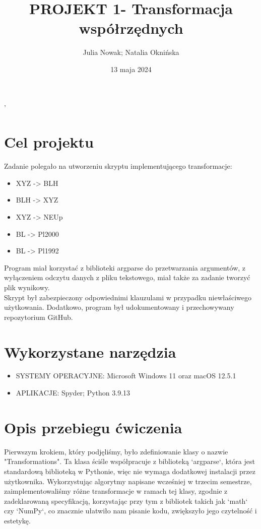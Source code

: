 '\documentclass[a4paper,12pt]{article}
\title{PROJEKT 1- Transformacja współrzędnych}
\author{Julia Nowak; Natalia Oknińska}
\date{13 maja 2024}
\begin{document}
\maketitle

\tableofcontents %

\section{Cel projektu}

Zadanie polegało na utworzeniu skryptu implementującego transformacje:

\begin{itemize}
  \item XYZ -> BLH
  \item BLH -> XYZ
  \item XYZ -> NEUp
  \item BL -> Pl2000
  \item BL -> Pl1992
\end{itemize}

Program miał korzystać z biblioteki argparse do przetwarzania argumentów, z wyłączeniem  odczytu danych z pliku tekstowego, miał także za zadanie tworzyć plik wynikowy.\\ Skrypt był zabezpieczony odpowiednimi klauzulami w przypadku niewłaściwego użytkowania. Dodatkowo, program był udokumentowany i przechowywany repozytorium GitHub.

\section{Wykorzystane narzędzia}

\begin{itemize}
  \item SYSTEMY OPERACYJNE: Microsoft Windows 11 oraz macOS 12.5.1
  \item APLIKACJE: Spyder; Python 3.9.13
 \end{itemize}

\section{Opis przebiegu ćwiczenia}

Pierwszym krokiem, który podjęliśmy, było zdefiniowanie klasy o nazwie "Transformations". Ta klasa ściśle współpracuje z biblioteką `argparse`, która jest standardową biblioteką w Pythonie, więc nie wymaga dodatkowej instalacji przez użytkownika. Wykorzystując algorytmy napisane wcześniej w trzecim semestrze, zaimplementowaliśmy różne transformacje w ramach tej klasy, zgodnie z zadeklarowaną specyfikacją, korzystając przy tym z bibliotek takich jak `math` czy `NumPy`, co znacznie ułatwiło nam pisanie kodu, zwiększyło jego czytelność i estetykę.
\end{document}
